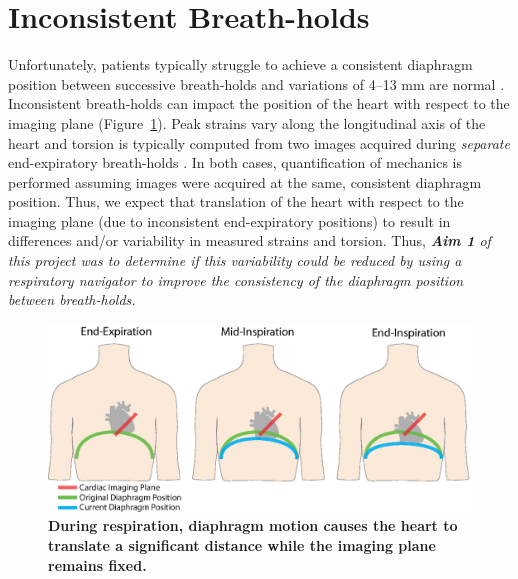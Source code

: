 \section{Inconsistent Breath-holds}
	Unfortunately, patients typically struggle to achieve a consistent diaphragm position between successive breath-holds and variations of 4--13 mm are normal \cite{Liu1993,Wang1995a,Taylor1997a,Holland1998c,Fischer2006a}. Inconsistent breath-holds can impact the position of the heart with respect to the imaging plane (Figure~\ref{fig:range_of_diaphragm_position_breathing}). Peak strains vary along the longitudinal axis of the heart \cite{Kuijer2002,Moore2000,Young1994a,Feng2009,NasiraeiMoghaddam2010,Donekal2013a,Suever2017} and torsion is typically computed from two images acquired during \textit{separate} end-expiratory breath-holds \cite{Donekal2013a}. In both cases, quantification of mechanics is performed assuming images were acquired at the same, consistent diaphragm position. Thus, we expect that translation of the heart with respect to the imaging plane (due to inconsistent end-expiratory positions) to result in differences and/or variability in measured strains and torsion. Thus, \textit{\textbf{Aim 1} of this project was to determine if this variability could be reduced by using a respiratory navigator to improve the consistency of the diaphragm position between breath-holds.}
	
	\begin{figure}
		\centering
		\includegraphics{figures/intro/range_of_diaphragm_position_breathing}
		\caption[During respiration, diaphragm motion causes the heart to translate a significant distance while the imaging plane remains fixed]{\textbf{During respiration, diaphragm motion causes the heart to translate a significant distance while the imaging plane remains fixed.}}
		\label{fig:range_of_diaphragm_position_breathing}
	\end{figure}
	
